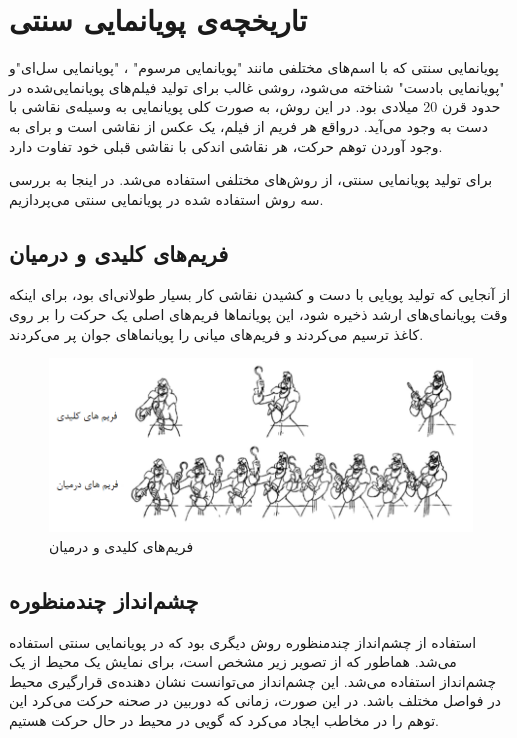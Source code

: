 \section{تاریخچه‌ی پویانمایی سنتی}

پویانمایی سنتی که با اسم‌های مختلفی مانند "پویانمایی مرسوم" ، "پویانمایی سل‌ای"و "پویانمایی بادست" شناخته می‌شود، روشی 
غالب برای تولید فیلم‌های پویانمایی‌شده در حدود قرن 20 میلادی بود.
در این روش، به صورت کلی پویانمایی به وسیله‌ی نقاشی با دست به وجود می‌آید.
درواقع هر فریم از فیلم، یک عکس از نقاشی است و
برای به وجود آوردن توهم حرکت، هر نقاشی اندکی با نقاشی قبلی خود تفاوت دارد.

برای تولید پویانمایی سنتی، از روش‌های مختلفی استفاده می‌شد. در اینجا به بررسی
سه روش استفاده شده در پویانمایی سنتی می‌پردازیم.
 
\subsection{فریم‌های کلیدی و درمیان}
از آنجایی که تولید پویایی با دست و کشیدن نقاشی کار بسیار طولانی‌ای بود، برای اینکه وقت پویانمای‌های ارشد 
ذخیره شود، این پویانماها فریم‌های اصلی یک حرکت را بر روی کاغذ ترسیم می‌کردند و 
فریم‌های میانی را پویانماهای جوان پر می‌کردند.
  
\begin{figure}[ht]
	\centerline{\includegraphics[width=\textwidth,height=\textheight,keepaspectratio]{Figures/Ch1/KeyframeAnimation.png}}

	\caption{فریم‌های کلیدی و درمیان \cite{Keyframeberkeley}}
	\label{fig:KeyframeAnimation}
\end{figure}

\subsection{چشم‌انداز چندمنظوره}

استفاده از چشم‌انداز چندمنظوره روش دیگری بود که در پویانمایی سنتی استفاده می‌شد.
هماطور که از تصویر زیر مشخص است، برای نمایش یک محیط از یک چشم‌انداز استفاده می‌شد.
این چشم‌انداز می‌توانست نشان دهنده‌ی قرارگیری محیط در فواصل مختلف باشد. در این صورت، زمانی که 
دوربین در صحنه حرکت می‌کرد این توهم را در مخاطب ایجاد می‌کرد که گویی در محیط در حال حرکت هستیم.

